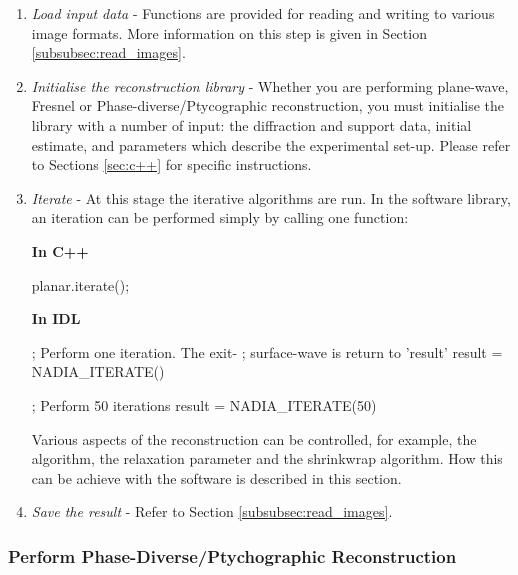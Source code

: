 \documentclass[]{nadia}
\begin{document}
\begin{enumerate}

\item {\it Load input data} - Functions are provided for reading and
  writing to various image formats. More information on this step is
  given in Section \ref{subsubsec:read_images}. 
  
\item {\it Initialise the reconstruction library} - Whether you are
  performing plane-wave, Fresnel or Phase-diverse/Ptycographic
  reconstruction, you must initialise the library with a number of
  input: the diffraction and support data, initial estimate, and
  parameters which describe the experimental set-up. Please refer to
  Sections \ref{sec:c++} for specific instructions.
      
\item {\it Iterate} - At this stage the iterative algorithms are run. In the software library, an iteration can be
  performed simply by calling one function:
      
      {\bf In C++}
      \begin{myverbatim}[language=C++]
        planar.iterate();
      \end{myverbatim}
      
      {\bf In IDL}
      \begin{myverbatim}[language=IDL]
        ; Perform one iteration. The exit-
        ; surface-wave is return to 'result'  
        result = NADIA_ITERATE()
        
        ; Perform 50 iterations
        result = NADIA_ITERATE(50)
      \end{myverbatim}

      Various aspects of the reconstruction can be controlled, for
      example, the algorithm, the relaxation parameter and the
      shrinkwrap algorithm. How this can be achieve with the software
      is described in this section. 


    \item {\it Save the result} - Refer to Section \ref{subsubsec:read_images}.

\end{enumerate}




\subsubsection{Perform Phase-Diverse/Ptychographic Reconstruction}
\label{subsubsec:rec_phase_div}
\end{document}
